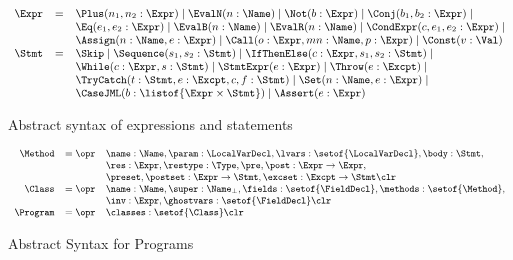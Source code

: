 \begin{figure}[t]
\[{\small
\begin{array}{rcl}
\Expr & = & \Plus(n_1, n_2 : \Expr) \mid
            \EvalN(n : \Name) \mid
            \Not(b : \Expr) \mid
            \Conj(b_1, b_2 : \Expr) \mid \\
      &   & \Eq(e_1, e_2 : \Expr) \mid
            \EvalB(n : \Name) \mid
            \EvalR(n : \Name) \mid
            \CondExpr(c, e_1, e_2 : \Expr) \mid\\
      &   & \Assign(n : \Name, e : \Expr) \mid
            \Call(o : \Expr, mn : \Name, p : \Expr) \mid
            \Const(v : \Val) \\
\Stmt & = & \Skip \mid
            \Sequence(s_1, s_2 : \Stmt) \mid
            \IfThenElse(c : \Expr, s_1, s_2 : \Stmt) \mid\\
      &   & \While(c : \Expr, s : \Stmt) \mid
            \StmtExpr(e : \Expr) \mid
            \Throw(e : \Excpt) \mid\\
      &   & \TryCatch(t: \Stmt, e : \Excpt, c, f : \Stmt) \mid
            \Set(n : \Name, e : \Expr) \mid\\
      &   & \CaseJML(b : \listof{\Expr \times \Stmt}) \mid
            \Assert(e : \Expr)
\end{array}}
\]
\caption{Abstract syntax of expressions and statements}
\label{FigExprStmt}
\end{figure}

\begin{figure}[t]
\[{\small
\begin{array}{rcl}
\Method & = \opr & \name : \Name,
                   \param : \LocalVarDecl,
                   \lvars : \setof{\LocalVarDecl},
                   \body : \Stmt,\\
        &        & \res : \Expr,
                   \restype : \Type,
                   \pre, \post : \Expr \rightarrow \Expr, \\
        &        & \preset, \postset : \Expr \rightarrow \Stmt,
                   \excset : \Excpt \rightarrow \Stmt \clr \\
\Class & = \opr & \name : \Name,
                  \super : \Name_{\bot},
                  \fields : \setof{\FieldDecl},
                  \methods : \setof{\Method},\\
        &       & \inv : \Expr,
                  \ghostvars : \setof{\FieldDecl} \clr\\
\Program & = \opr & \classes : \setof{\Class} \clr
\end{array}}
\]
\caption{Abstract Syntax for Programs}\label{FigProgram}
\end{figure}

